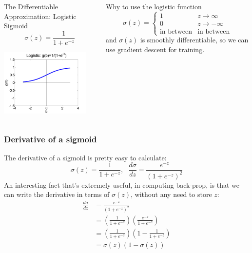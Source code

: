 \documentclass{beamer}
\begin{document}
\begin{frame}
  \begin{columns}[t]
    \column{2.25in}
    \begin{block}{The Differentiable Approximation: Logistic Sigmoid}
      \[
      \sigma(z)=\frac{1}{1+e^{-z}}
      \]
      \centerline{\includegraphics[width=1.75in]{figs/nn_logistic.png}}
    \end{block}
    \column{2.25in}
    \begin{block}{Why to use the logistic function}
      \[
      \sigma(z) = \begin{cases}
        1 & z\rightarrow\infty\\
        0 & z\rightarrow -\infty\\
        \mbox{in between} & \mbox{in between}
      \end{cases}
      \]
      and $\sigma(z)$ is smoothly differentiable, so we can use
      gradient descent for training.
    \end{block}
  \end{columns}
\end{frame}

\begin{frame}
  \frametitle{Derivative of a sigmoid}
  The derivative of a sigmoid is pretty easy to calculate:
  \[
  \sigma(z)=\frac{1}{1+e^{-z}},~~~\frac{d\sigma}{dz}=\frac{e^{-z}}{(1+e^{-z})^2}
  \]
  An interesting fact that's extremely useful, in computing back-prop,
  is that we can write the derivative in terms
  of $\sigma(z)$, without any need to store $z$:
  \begin{align*}
    \frac{d\sigma}{dz} &=\frac{e^{-z}}{(1+e^{-z})^2}\\
    &=\left(\frac{1}{1+e^{-z}}\right)\left(\frac{e^{-z}}{1+e^{-z}}\right)\\
    &=\left(\frac{1}{1+e^{-z}}\right)\left(1-\frac{1}{1+e^{-z}}\right)\\
    &=\sigma(z)(1-\sigma(z))
  \end{align*}
\end{frame}
\end{document}

